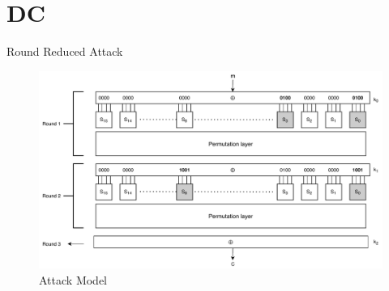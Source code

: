 \section{DC}

\begin{frame}{Round Reduced Attack}
\begin{figure}[H]
        \centering
        \minipage{\textwidth}
        \includegraphics[width=\linewidth]{DC1.pdf}
        \endminipage
        \caption{Attack Model}
    \end{figure}
\end{frame}

